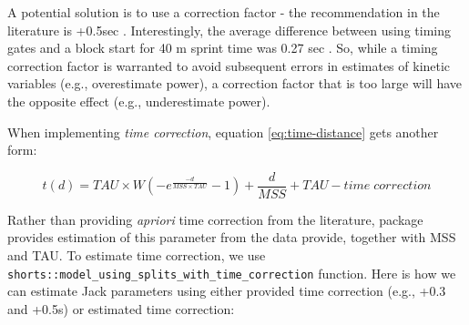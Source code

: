 \documentclass[
]{jss}
\begin{document}
A potential solution is to use a correction factor - the recommendation in the literature is +0.5sec \citep{haugenSprintMechanicalProperties2020, haugenSprintMechanicalVariables2019}. Interestingly, the average difference between using timing gates and a block start for 40 m sprint time was 0.27 sec \citep{haugenDifferenceStartImpact2012}. So, while a timing correction factor is warranted to avoid subsequent errors in estimates of kinetic variables (e.g., overestimate power), a correction factor that is too large will have the opposite effect (e.g., underestimate power).

When implementing \emph{time correction}, equation \eqref{eq:time-distance} gets another form:

\begin{equation}
  t(d) = TAU \times W(-e^{\frac{-d}{MSS \times TAU}} - 1) + \frac{d}{MSS} + TAU - time \; correction \label{eq:time-correction}
\end{equation}

Rather than providing \emph{apriori} time correction from the literature,  package provides estimation of this parameter from the data provide, together with MSS and TAU. To estimate time correction, we use \texttt{shorts::model\_using\_splits\_with\_time\_correction} function. Here is how we can estimate Jack parameters using either provided time correction (e.g., +0.3 and +0.5s) or estimated time correction:
\end{document}
